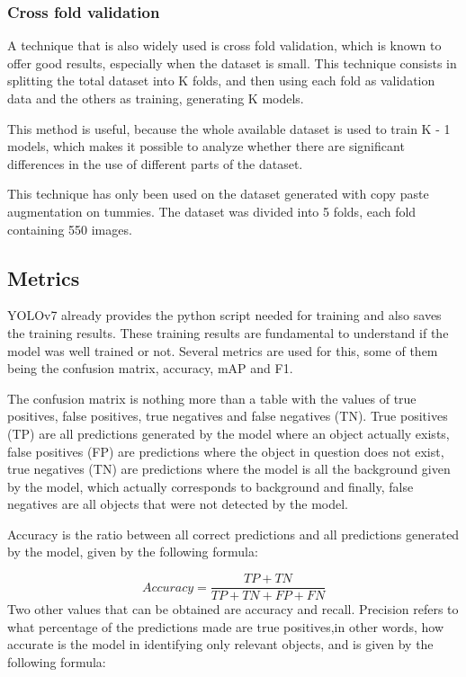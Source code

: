 \subsubsection{Cross fold validation}
A technique that is also widely used is cross fold validation, which is known to offer good results, especially when the dataset is small. This technique consists in splitting the total dataset into K folds, and then using each fold as validation data and the others as training, generating K models.

This method is useful, because the whole available dataset is used to train K - 1 models, which makes it possible to analyze whether there are significant differences in the use of different parts of the dataset.

This technique has only been used on the dataset generated with copy paste augmentation on tummies. The dataset was divided into 5 folds, each fold containing 550 images.



\subsection{Metrics}

YOLOv7 already provides the python script needed for training and also saves the training results. These training results are fundamental to understand if the model was well trained or not. Several metrics are used for this, some of them being the confusion matrix, accuracy, mAP and F1.

The confusion matrix is nothing more than a table with the values of true positives, false positives, true negatives and false negatives (TN). True positives (TP) are all predictions generated by the model where an object actually exists, false positives (FP) are predictions where the object in question does not exist, true negatives (TN) are predictions where the model is all the background given by the model, which actually corresponds to background and finally, false negatives are all objects that were not detected by the model.

Accuracy is the ratio between all correct predictions and all predictions generated by the model, given by the following formula:

\begin{equation}
     Accuracy = \frac{TP + TN}{TP + TN + FP + FN}
\end{equation}
Two other values that can be obtained are accuracy and recall\cite{yoloMetrics}. Precision refers to what percentage of the predictions made are true positives,in other words, how accurate is the model in identifying only relevant objects, and is given by the following formula:

